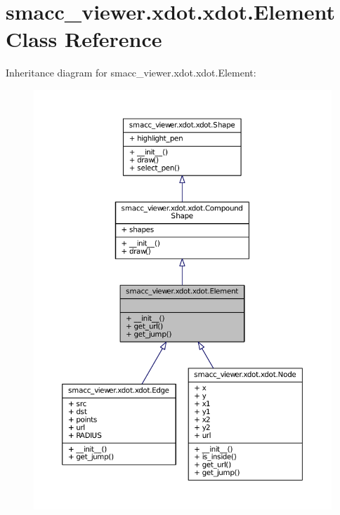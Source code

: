 \hypertarget{classsmacc__viewer_1_1xdot_1_1xdot_1_1Element}{}\section{smacc\+\_\+viewer.\+xdot.\+xdot.\+Element Class Reference}
\label{classsmacc__viewer_1_1xdot_1_1xdot_1_1Element}


Inheritance diagram for smacc\+\_\+viewer.\+xdot.\+xdot.\+Element\+:
\nopagebreak
\begin{figure}[H]
\begin{center}
\leavevmode
\includegraphics[width=350pt]{classsmacc__viewer_1_1xdot_1_1xdot_1_1Element__inherit__graph}
\end{center}
\end{figure}


